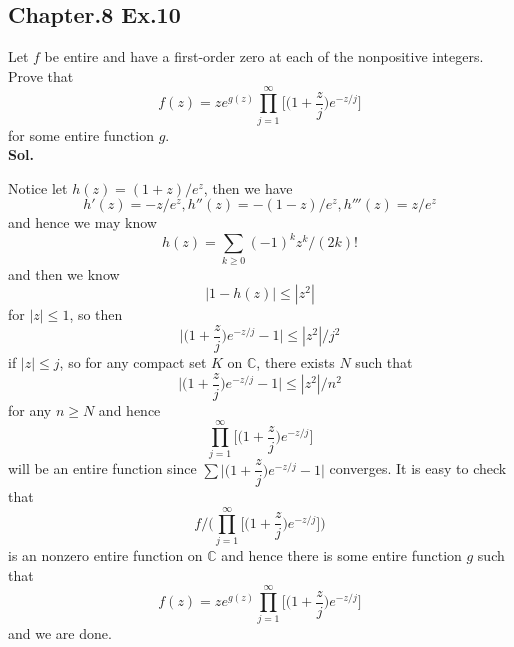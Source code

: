 \documentclass[lang=en,11pt,a4paper,citestyle =authoryear]{elegantpaper}
\newcommand{\C}{\mathbb{C}}
\begin{document}
\subsection*{Chapter.8 Ex.10} 
Let $f$ be entire and have a first-order zero at each of the nonpositive integers. Prove that
\[
f(z) = ze^{g(z)}\prod_{j=1}^{\infty}\Big[\Big(1+\dfrac{z}{j}\Big)e^{-z/j}\Big]
\]
for some entire function $g$.
\vspace{0.5em}\\
\textbf{Sol.} \par
Notice let $h(z) = (1+z)/e^z$, then we have
\[
h'(z) = -z/e^z, h''(z) = -(1-z)/e^z, h'''(z) = z/e^z
\]
and hence we may know
\[
h(z) = \sum\limits_{k\geq 0} (-1)^{k}z^k/(2k)!
\]
and then we know
\[
|1- h (z)| \leq |z^2|
\]
for $|z| \leq 1$, so then
\[
\Big|\Big(1+\dfrac{z}{j}\Big)e^{-z/j} - 1\Big| \leq |z^2|/j^2
\]
if $|z| \leq j$, so for any compact set $K$ on $\C$, there exists $N$ such that
\[
\Big|\Big(1+\dfrac{z}{j}\Big)e^{-z/j} - 1\Big| \leq |z^2|/n^2
\]
for any $n\geq N$ and hence
\[
\prod_{j=1}^{\infty}\Big[\Big(1+\dfrac{z}{j}\Big)e^{-z/j}\Big]
\]
will be an entire function since $\sum \Big|\Big(1+\dfrac{z}{j}\Big)e^{-z/j} - 1\Big|$ converges. It is easy to check that
\[
f/\Big(\prod_{j=1}^{\infty}\Big[\Big(1+\dfrac{z}{j}\Big)e^{-z/j}\Big]\Big)
\]
is an nonzero entire function on $\C$ and hence there is some entire function $g$ such that
\[
f(z) = ze^{g(z)}\prod_{j=1}^{\infty}\Big[\Big(1+\dfrac{z}{j}\Big)e^{-z/j}\Big]
\]
and we are done.
\vspace{0.5em}
\end{document}
